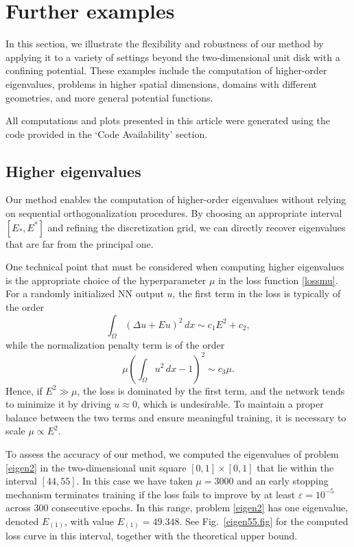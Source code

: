 \documentclass[11pt]{amsart}
\theoremstyle{definition}
\theoremstyle{remark}
\theoremstyle{plain}
\begin{document}
\section{Further examples}

In this section, we illustrate the flexibility and robustness of our method by applying it to a variety of settings beyond the two-dimensional unit disk with a confining potential. These examples include the computation of higher-order eigenvalues, problems in higher spatial dimensions, domains with different geometries, and more general potential functions.


All computations and plots presented in this article were generated using the code provided in the `Code Availability' section.

\subsection{Higher eigenvalues}
Our method enables the computation of higher-order eigenvalues without relying on sequential orthogonalization procedures. By choosing an appropriate interval $[E_*, E^*]$ and refining the discretization grid, we can directly recover eigenvalues that are far from the principal one.

One technical point that must be considered when computing higher eigenvalues is the appropriate choice of the hyperparameter $\mu$ in the loss function \eqref{lossmu}. For a randomly initialized NN output $u$, the first term in the loss is typically of the order
$$
\int_\Omega (\Delta u + E u)^2\, dx \sim c_1 E^2 + c_2,
$$
while the normalization penalty term is of the order
$$
\mu \left( \int_\Omega u^2\, dx - 1 \right)^2 \sim c_3 \mu.
$$
Hence, if $E^2 \gg \mu$, the loss is dominated by the first term, and the network tends to minimize it by driving $u \approx 0$, which is undesirable. To maintain a proper balance between the two terms and ensure meaningful training, it is necessary to scale $\mu \propto E^2 $.


To assess the accuracy of our method, we computed the eigenvalues of problem \eqref{eigen2} in the two-dimensional unit square $[0,1]\times[0,1]$ that lie within the interval $[44, 55]$. In this case we have taken $\mu=3000$ and an early stopping mechanism terminates training if the loss fails to improve by at least $\varepsilon =10^{-5}$ across 300 consecutive epochs. In this range, problem \eqref{eigen2} has one eigenvalue, denoted $E_{(1)}$, with value $E_{(1)} = 49.348$. See Fig.~\ref{eigen55.fig} for the computed loss curve in this interval, together with the theoretical upper bound.
\end{document}
